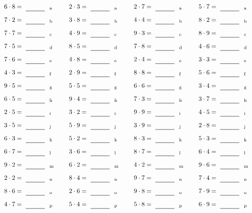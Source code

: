 \documentclass
[
  draft    = true,
  fontsize = 11pt,
  parskip  = half-
]
{scrartcl}
\begin{document}
\par\vfill\par
\begin{align*}
    \pline{6\cdot8}&=\rline{a}
  & \pline{2\cdot3}&=\rline{a}
  & \pline{2\cdot7}&=\rline{a}
  & \pline{5\cdot7}&=\rline{a} \\[1ex]
    \pline{7\cdot2}&=\rline{b}
  & \pline{3\cdot8}&=\rline{b}
  & \pline{4\cdot4}&=\rline{b}
  & \pline{8\cdot2}&=\rline{b} \\[1ex]
    \pline{7\cdot7}&=\rline{c}
  & \pline{4\cdot9}&=\rline{c}
  & \pline{9\cdot3}&=\rline{c}
  & \pline{8\cdot9}&=\rline{c} \\[1ex]
    \pline{7\cdot5}&=\rline{d}
  & \pline{8\cdot5}&=\rline{d}
  & \pline{7\cdot8}&=\rline{d}
  & \pline{4\cdot6}&=\rline{d} \\[1ex]
    \pline{7\cdot6}&=\rline{e}
  & \pline{4\cdot8}&=\rline{e}
  & \pline{2\cdot4}&=\rline{e}
  & \pline{3\cdot3}&=\rline{e} \\[1ex]
    \pline{4\cdot3}&=\rline{f}
  & \pline{2\cdot9}&=\rline{f}
  & \pline{8\cdot8}&=\rline{f}
  & \pline{5\cdot6}&=\rline{f} \\[1ex]
    \pline{9\cdot5}&=\rline{g}
  & \pline{5\cdot5}&=\rline{g}
  & \pline{6\cdot6}&=\rline{g}
  & \pline{3\cdot4}&=\rline{g} \\[1ex]
    \pline{6\cdot5}&=\rline{h}
  & \pline{9\cdot4}&=\rline{h}
  & \pline{7\cdot3}&=\rline{h}
  & \pline{3\cdot7}&=\rline{h} \\[1ex]
    \pline{2\cdot5}&=\rline{i}
  & \pline{3\cdot2}&=\rline{i}
  & \pline{9\cdot9}&=\rline{i}
  & \pline{4\cdot5}&=\rline{i} \\[1ex]
    \pline{3\cdot5}&=\rline{j}
  & \pline{5\cdot9}&=\rline{j}
  & \pline{3\cdot9}&=\rline{j}
  & \pline{2\cdot8}&=\rline{j} \\[1ex]
    \pline{6\cdot3}&=\rline{k}
  & \pline{5\cdot2}&=\rline{k}
  & \pline{8\cdot3}&=\rline{k}
  & \pline{5\cdot3}&=\rline{k} \\[1ex]
    \pline{6\cdot7}&=\rline{l}
  & \pline{3\cdot6}&=\rline{l}
  & \pline{8\cdot7}&=\rline{l}
  & \pline{6\cdot4}&=\rline{l} \\[1ex]
    \pline{9\cdot2}&=\rline{m}
  & \pline{6\cdot2}&=\rline{m}
  & \pline{4\cdot2}&=\rline{m}
  & \pline{9\cdot6}&=\rline{m} \\[1ex]
    \pline{2\cdot2}&=\rline{n}
  & \pline{8\cdot4}&=\rline{n}
  & \pline{9\cdot7}&=\rline{n}
  & \pline{7\cdot4}&=\rline{n} \\[1ex]
    \pline{8\cdot6}&=\rline{o}
  & \pline{2\cdot6}&=\rline{o}
  & \pline{9\cdot8}&=\rline{o}
  & \pline{7\cdot9}&=\rline{o} \\[1ex]
    \pline{4\cdot7}&=\rline{p}
  & \pline{5\cdot4}&=\rline{p}
  & \pline{5\cdot8}&=\rline{p}
  & \pline{6\cdot9}&=\rline{p}
\end{align*}
\end{document}
